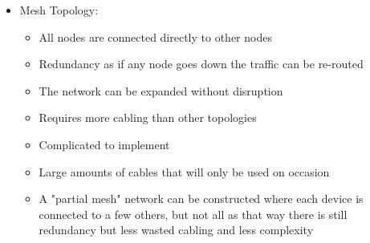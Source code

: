 \begin{itemize}
  \item Mesh Topology:
  \begin{itemize}
    \item All nodes are connected directly to other nodes
    \item Redundancy as if any node goes down the traffic can be re-routed
    \item The network can be expanded without disruption
    \item Requires more cabling than other topologies
    \item Complicated to implement
    \item Large amounts of cables that will only be used on occasion
    \item A "partial mesh" network can be constructed where each device is connected to a few others, but not all as that way there is still redundancy but less wasted cabling and less complexity
  \end{itemize}
\end{itemize}